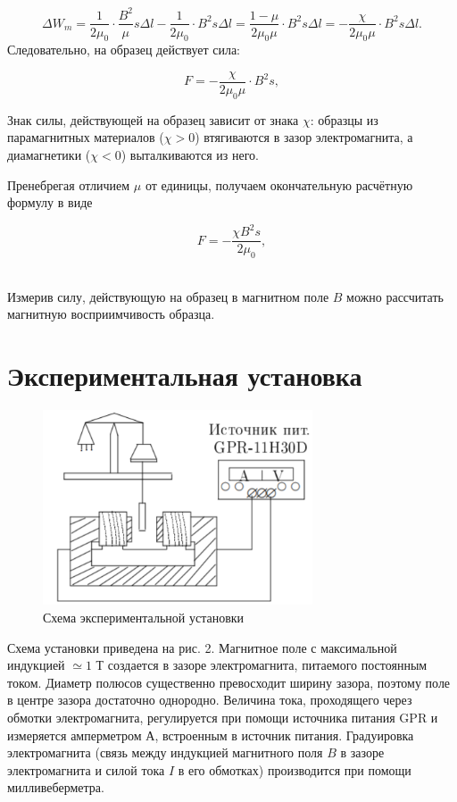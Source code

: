 \documentclass[a4paper,14pt]{article}
\begin{document}
\begin{equation*}
\Delta W_{m} = \dfrac{1}{2\mu_0}\cdot\dfrac{B^2}{\mu}s\Delta l - \dfrac{1}{2\mu_0}\cdot B^2 s\Delta l = \dfrac{1 - \mu}{2\mu_0 \mu}\cdot B^2 s\Delta l = -\dfrac{\chi}{2\mu_0 \mu}\cdot B^2 s\Delta l.
\end{equation*} 
Следовательно, на образец действует сила:

\begin{equation}
F = -\dfrac{\chi}{2\mu_0 \mu}\cdot B^2 s, 
\end{equation}

Знак силы, действующей на образец зависит от знака $\chi$: образцы из парамагнитных материалов ($\chi > 0$) втягиваются в зазор электромагнита, а диамагнетики ($\chi < 0$) выталкиваются из него.

Пренебрегая отличием $\mu$ от единицы, получаем окончательную расчётную формулу в виде

\begin{equation}
F = -\dfrac{\chi B^2 s}{2\mu_0}, 
\end{equation}\

Измерив силу, действующую на образец в магнитном поле $B$ можно рассчитать магнитную восприимчивость образца.

\section*{Экспериментальная установка}
\begin{figure}[!h]
	\centering
	\includegraphics[width = 8cm]{second}
	\caption{Схема экспериментальной установки}
\end{figure}

Схема установки приведена на рис. 2. Магнитное поле с максимальной индукцией $\simeq 1$ Т создается в зазоре электромагнита, питаемого постоянным током. Диаметр полюсов существенно превосходит ширину зазора, поэтому поле в центре зазора достаточно однородно. Величина тока, проходящего через обмотки электромагнита, регулируется при помощи источника питания GPR и измеряется амперметром А, встроенным в источник питания. Градуировка электромагнита (связь между индукцией магнитного поля $B$ в зазоре электромагнита и силой тока $I$ в его обмотках) производится при помощи милливеберметра. 
\end{document}

